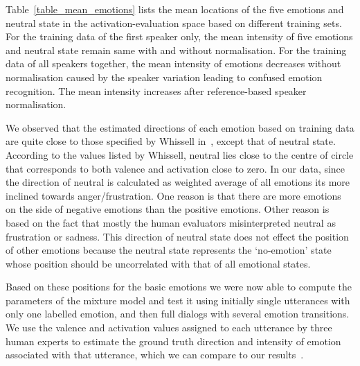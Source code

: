 \documentclass[10pt,journal,cspaper,compsoc]{IEEEtran}
\begin{document}

Table~\ref{table_mean_emotions} lists the mean locations of the five emotions and neutral state in the activation-evaluation space based on different training sets. For the training data of the first speaker only, the mean intensity of five emotions and neutral state remain same with and without normalisation. For the training data of all speakers together, the mean intensity of emotions decreases without normalisation caused by the speaker variation  leading to confused emotion recognition. The mean intensity increases after reference-based speaker normalisation.

We observed that the estimated directions of each emotion based on training data are quite close to those specified by Whissell in~\cite{Whissell89}, except that of neutral state.  According to the values listed by Whissell, neutral lies close to the centre of circle that corresponds to both valence and activation close to zero. In our data, since the direction of neutral is calculated as weighted average of all emotions its more inclined towards anger/frustration. One reason is that there are more emotions on the side of negative emotions than the positive emotions. Other reason is based on the fact that mostly the human evaluators misinterpreted neutral as frustration or sadness. This direction of neutral state does not effect the position of other emotions because the neutral state represents the `no-emotion' state whose position should be uncorrelated with that of all emotional states.


Based on these positions for the basic emotions we were now able to compute the parameters of the mixture model and test it using initially single utterances with only one labelled emotion, and then full dialogs with several emotion transitions. We use the valence and activation values assigned to each utterance by three human experts to estimate the ground truth direction and intensity of emotion associated with that utterance, which we can compare to our results~\cite{ayesha von mises}. 
\end{document}
